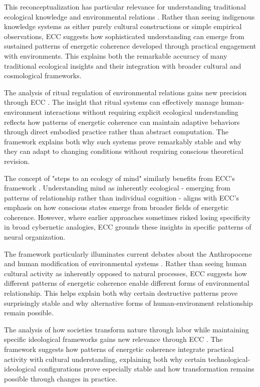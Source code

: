This reconceptualization has particular relevance for understanding traditional ecological knowledge and environmental relations \cite{ingold2000perception}. Rather than seeing indigenous knowledge systems as either purely cultural constructions or simple empirical observations, ECC suggests how sophisticated understanding can emerge from sustained patterns of energetic coherence developed through practical engagement with environments. This explains both the remarkable accuracy of many traditional ecological insights and their integration with broader cultural and cosmological frameworks.

The analysis of ritual regulation of environmental relations gains new precision through ECC \cite{rappaport1999ritual}. The insight that ritual systems can effectively manage human-environment interactions without requiring explicit ecological understanding reflects how patterns of energetic coherence can maintain adaptive behaviors through direct embodied practice rather than abstract computation. The framework explains both why such systems prove remarkably stable and why they can adapt to changing conditions without requiring conscious theoretical revision.

The concept of "steps to an ecology of mind" similarly benefits from ECC's framework \cite{bateson1972steps}. Understanding mind as inherently ecological - emerging from patterns of relationship rather than individual cognition - aligns with ECC's emphasis on how conscious states emerge from broader fields of energetic coherence. However, where earlier approaches sometimes risked losing specificity in broad cybernetic analogies, ECC grounds these insights in specific patterns of neural organization.

The framework particularly illuminates current debates about the Anthropocene and human modification of environmental systems \cite{tsing2015mushroom}. Rather than seeing human cultural activity as inherently opposed to natural processes, ECC suggests how different patterns of energetic coherence enable different forms of environmental relationship. This helps explain both why certain destructive patterns prove surprisingly stable and why alternative forms of human-environment relationship remain possible.

The analysis of how societies transform nature through labor while maintaining specific ideological frameworks gains new relevance through ECC \cite{latour1993modern}. The framework suggests how patterns of energetic coherence integrate practical activity with cultural understanding, explaining both why certain technological-ideological configurations prove especially stable and how transformation remains possible through changes in practice.

